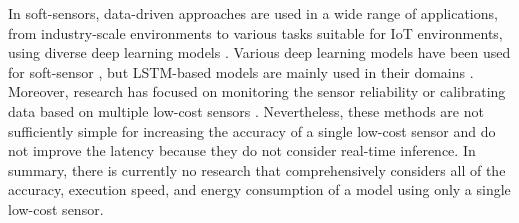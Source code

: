 In soft-sensors, data-driven approaches are used in a wide range of applications, from industry-scale environments to various tasks suitable for IoT environments, using diverse deep learning models \cite{Ke_2017, LoyBenitez_2020, Sun_2021}. Various deep learning models have been used for soft-sensor \cite{Sun_2021}, but LSTM-based models are mainly used in their domains \cite{Ke_2017, LoyBenitez_2020}. Moreover, research has focused on monitoring the sensor reliability or calibrating data based on multiple low-cost sensors \cite{Cheng_2020, Cheng_2022, Zuniga_2022}. Nevertheless, these methods are not sufficiently simple for increasing the accuracy of a single low-cost sensor and do not improve the latency because they do not consider real-time inference. In summary, there is currently no research that comprehensively considers all of the accuracy, execution speed, and energy consumption of a model using only a single low-cost sensor.